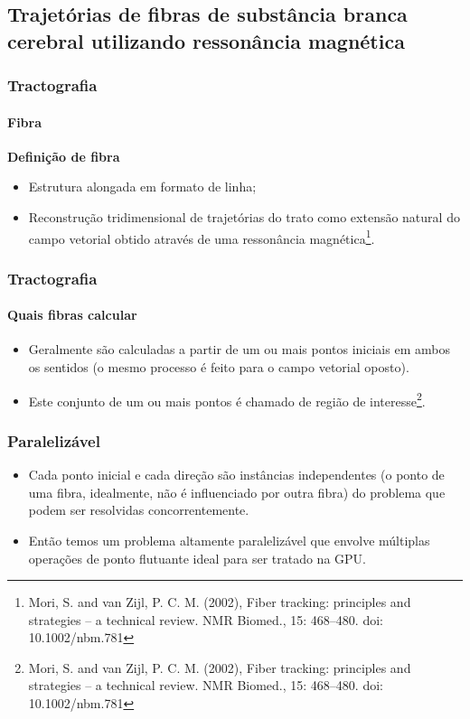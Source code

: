 \documentclass[brazil, 10pt]{beamer}
\begin{document}
\subsection{Trajetórias de fibras de substância branca cerebral utilizando ressonância magnética}
\begin{frame}
  \frametitle{Tractografia}
  \framesubtitle{Fibra}
  \textbf{Definição de fibra}
  \begin{itemize}
    \item Estrutura alongada em formato de linha;
    \item Reconstrução tridimensional de trajetórias do trato como extensão natural do campo vetorial obtido através de uma ressonância magnética\footnote{Mori, S. and van Zijl, P. C. M. (2002), Fiber tracking: principles and strategies – a technical review. NMR Biomed., 15: 468–480. doi: 10.1002/nbm.781}.
  \end{itemize}
  
\end{frame}

\begin{frame}
  \frametitle{Tractografia}
  \framesubtitle{Quais fibras calcular}
  \begin{itemize}
    \item Geralmente são calculadas a partir de um ou mais pontos iniciais em ambos os sentidos (o mesmo processo é feito para o campo vetorial oposto).
    \item Este conjunto de um ou mais pontos é chamado de região de interesse\footnote{Mori, S. and van Zijl, P. C. M. (2002), Fiber tracking: principles and strategies – a technical review. NMR Biomed., 15: 468–480. doi: 10.1002/nbm.781}.
  \end{itemize}
\end{frame}

\begin{frame}
  \frametitle{Paralelizável}
  
  \begin{itemize}
    \item Cada ponto inicial e cada direção são instâncias independentes (o ponto de uma fibra, idealmente, não é influenciado por outra fibra) do problema que podem ser resolvidas concorrentemente.
    \item Então temos um problema altamente paralelizável que envolve múltiplas operações de ponto flutuante ideal para ser tratado na GPU.
  \end{itemize}
\end{frame}
\end{document}
